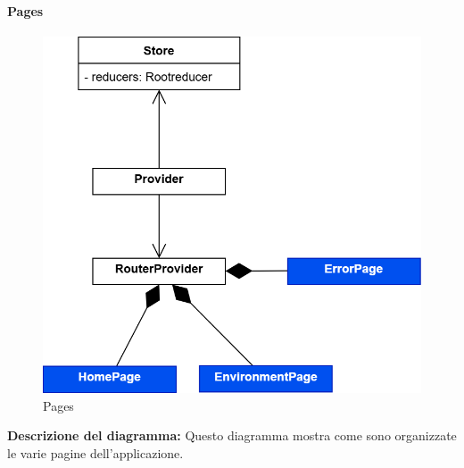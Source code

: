 \paragraph{Pages}
\begin{figure}[h!] \centering
      \includegraphics[scale=0.3]{template/images/uml_front/ui/pages.png}
      \caption{Pages}
\end{figure}
\textbf{Descrizione del diagramma:}
Questo diagramma mostra come sono organizzate le varie pagine dell'applicazione.
